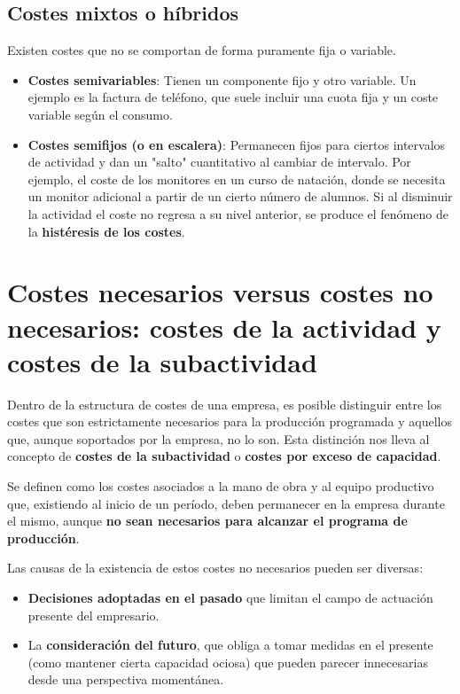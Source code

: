 \subsection{Costes mixtos o híbridos}
Existen costes que no se comportan de forma puramente fija o variable.
\begin{itemize}
    \item \textbf{Costes semivariables}: Tienen un componente fijo y otro variable. Un ejemplo es la factura de teléfono, que suele incluir una cuota fija y un coste variable según el consumo.
    \item \textbf{Costes semifijos (o en escalera)}: Permanecen fijos para ciertos intervalos de actividad y dan un "salto" cuantitativo al cambiar de intervalo. Por ejemplo, el coste de los monitores en un curso de natación, donde se necesita un monitor adicional a partir de un cierto número de alumnos. Si al disminuir la actividad el coste no regresa a su nivel anterior, se produce el fenómeno de la \textbf{histéresis de los costes}.
\end{itemize}

\section{Costes necesarios versus costes no necesarios: costes de la actividad y costes de la subactividad}

Dentro de la estructura de costes de una empresa, es posible distinguir entre los costes que son estrictamente necesarios para la producción programada y aquellos que, aunque soportados por la empresa, no lo son. Esta distinción nos lleva al concepto de \textbf{costes de la subactividad} o \textbf{costes por exceso de capacidad}.

Se definen como los costes asociados a la mano de obra y al equipo productivo que, existiendo al inicio de un período, deben permanecer en la empresa durante el mismo, aunque \textbf{no sean necesarios para alcanzar el programa de producción}.

Las causas de la existencia de estos costes no necesarios pueden ser diversas:
\begin{itemize}
    \item \textbf{Decisiones adoptadas en el pasado} que limitan el campo de actuación presente del empresario.
    \item La \textbf{consideración del futuro}, que obliga a tomar medidas en el presente (como mantener cierta capacidad ociosa) que pueden parecer innecesarias desde una perspectiva momentánea.
\end{itemize}

